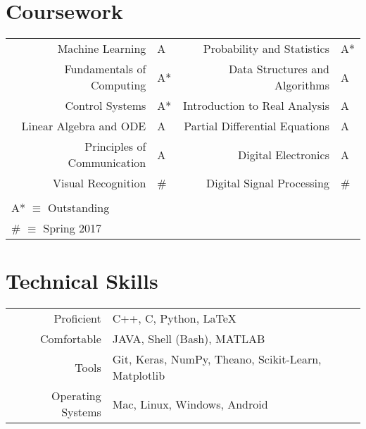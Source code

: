 \documentclass[a4paper,10pt]{article}
\begin{document}
\section{Coursework}
\centering
\begin{tabular}{rl|rl}
Machine Learning & A & Probability and Statistics & A*\\
Fundamentals of Computing & A* & Data Structures and Algorithms & A\\
Control Systems & A* & Introduction to Real Analysis & A\\
Linear Algebra and ODE & A & Partial Differential Equations & A\\
Principles of Communication & A & Digital Electronics & A\\
Visual Recognition & \# & Digital Signal Processing & \#\\ \\

\multicolumn{4}{l}{\footnotesize A* $\equiv$ Outstanding}\\
\multicolumn{4}{l}{\footnotesize \# $\equiv$ Spring 2017}
\end{tabular}

\section{Technical Skills}
\begin{tabular}{rp{11cm}}
Proficient & C++, C, Python, \LaTeX\\
Comfortable & JAVA, Shell (Bash), MATLAB\\
Tools & Git, Keras, NumPy, Theano, Scikit-Learn, Matplotlib\\
Operating Systems & Mac, Linux, Windows, Android
\end{tabular}

\end{document}
